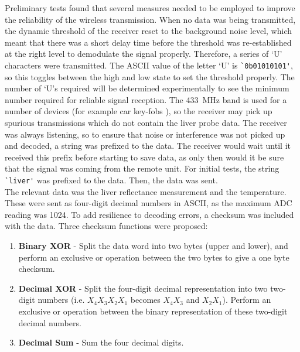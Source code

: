 Preliminary tests found that several measures needed to be employed to improve the reliability of the wireless transmission. When no data was being transmitted, the dynamic threshold of the receiver reset to the background noise level, which meant that there was a short delay time before the threshold was re-established at the right level to demodulate the signal properly. Therefore, a series of `U' characters were transmitted. The ASCII value of the letter `U' is \verb|`0b01010101'|, so this toggles between the high and low state to set the threshold properly. The number of `U's required will be determined experimentally to see the minimum number required for reliable signal reception. The \SI{433}{\mega\hertz} band is used for a number of devices (for example car key-fobs \cite{qam-rx}), so the receiver may pick up spurious transmissions which do not contain the liver probe data. The receiver was always listening, so to ensure that noise or interference was not picked up and decoded, a string was prefixed to the data. The receiver would wait until it received this prefix before starting to save data, as only then would it be sure that the signal was coming from the remote unit. For initial tests, the string \verb|`liver'| was prefixed to the data. Then, the data was sent. \\

The relevant data was the liver reflectance measurement and the temperature. These were sent as four-digit decimal numbers in ASCII, as the maximum ADC reading was 1024. To add resilience to decoding errors, a checksum was included with the data. Three checksum functions were proposed:
\begin{enumerate}
\item \label{check: binary xor} \textbf{Binary XOR} - Split the data word into two bytes (upper and lower), and perform an exclusive or operation between the two bytes to give a one byte checksum.
\item \label{check: decimal xor} \textbf{Decimal XOR} - Split the four-digit decimal representation into two two-digit numbers (i.e. $X_4X_3X_2X_1$ becomes $X_4X_3$ and $X_2X_1$). Perform an exclusive or operation between the binary representation of these two-digit decimal numbers.
\item \label{check: decimal sum} \textbf{Decimal Sum} - Sum the four decimal digits.
\end{enumerate}

